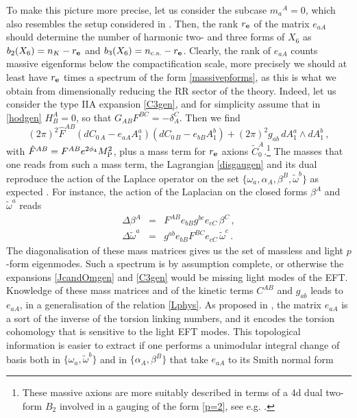 \documentclass[11pt]{article}
\def\a {\alpha}
\def\b {\beta}
\def\be{\begin{equation}}
\def\ee{\end{equation}}
\def\om{\omega}
\begin{document}
To make this picture more precise, let us consider the subcase $m_a{}^A =0$, which also resembles the setup considered in \cite{Camara:2011jg}. Then, the rank $r_{\bf e}$ of the matrix $e_{aA}$ should determine the number of harmonic two- and three forms of $X_6$ as $b_2(X_6) = n_K- r_{\bf e}$ and $b_3(X_6) = n_{\rm c.s.} - r_{\bf e}$. Clearly, the rank of $e_{aA}$ counts massive  eigenforms below the compactification scale, more precisely we should at least have $r_{\bf e}$ times a spectrum of the form \eqref{massivepforms}, as this is what we obtain from dimensionally reducing the RR sector of the theory. Indeed, let us consider the type IIA expansion \eqref{C3gen}, and for simplicity assume that in \eqref{hodgen} $H^A_B =0$, so that $G_{AB}F^{BC} = - \delta_A^C$. Then we find
\be
(2\pi)^2 \hat{F}^{AB} \left( dC_{0\,  A} - e_{aA} A_1^a\right) \left( dC_{0\, B} -e_{bB} A_1^b\right) + (2\pi)^2 g_{ab}\, dA_1^a \wedge dA_1^b\, , 
\label{disgaugen}
\ee
with $ \hat{F}^{AB} =   F^{AB} e^{2\phi_4} M_{\rm P}^2$, plus a mass term for $r_{\bf e}$ axions $\tilde{C}_0^A$.\footnote{These massive axions are more suitably described in terms of a 4d dual two-form $B_2$ involved in a gauging of the form \eqref{p=2}, see e.g. \cite{Marchesano:2014mla}.} The masses that one reads from such a mass term, the Lagrangian \eqref{disgaugen} and its dual reproduce the action of the Laplace operator on the set $\{\om_a, \a_A, \b^B, \tilde{\om}^b\}$ as expected \cite{Tomasiello:2005bp,Grana:2005ny,Kashani-Poor:2006ofe}. For instance, the action of the Laplacian on the closed forms $\b^A$ and $\tilde{\om}^a$ reads
\begin{eqnarray}
    \Delta \beta^A &= &F^{AB}e_{bB}g^{bc}e_{cC}\, \beta^C \, , \\
    \Delta \tilde{\om}^a &= & g^{ab} e_{bB}F^{BC}e_{cC} \, \tilde{\om}^c \, .
\end{eqnarray}
The diagonalisation of these mass matrices gives us the set of massless and light $p$-form eigenmodes. Such a spectrum is by assumption complete, or otherwise the expansions \eqref{JcandOmgen} and \eqref{C3gen} would be missing light modes of the EFT.     Knowledge of these mass matrices and of the kinetic terms $C^{AB}$ and $g_{ab}$ leads to $e_{aA}$, in a generalisation of the relation \eqref{Lphys}. As proposed in \cite{Camara:2011jg}, the matrix $e_{aA}$ is a sort of the inverse of the torsion linking numbers, and it encodes the torsion cohomology that is sensitive to the light EFT modes. This topological information is easier to extract if one performs a unimodular integral change of basis both in $\{\om_a, \tilde{\om}^b\}$ and in $\{\a_A, \b^B\}$ that take $e_{aA}$ to its Smith normal form
\end{document}
